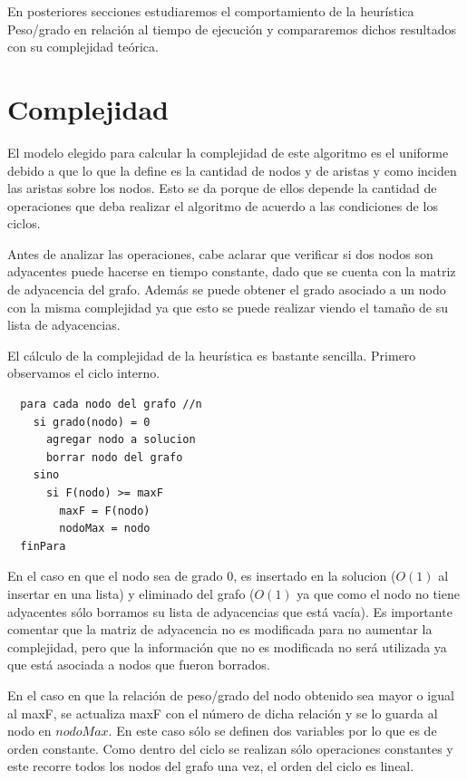 \documentclass[a4paper,11pt] {article}
\begin{document}
En posteriores secciones estudiaremos el comportamiento de la heur\'istica Peso/grado en relaci\'on al tiempo de ejecuci\'on y compararemos dichos resultados con su complejidad te\'orica.

\section*{Complejidad}

El modelo elegido para calcular la complejidad de este algoritmo es el uniforme debido a que lo que la define es la cantidad de nodos y de aristas y como inciden las aristas sobre los nodos. Esto se da porque de ellos depende la cantidad de operaciones que deba realizar el algoritmo de acuerdo a las condiciones de los ciclos.

Antes de analizar las operaciones, cabe aclarar que verificar si dos nodos son adyacentes puede hacerse en tiempo constante, dado que se cuenta con la matriz de adyacencia del grafo. Además se puede obtener el grado asociado a un nodo con la misma complejidad ya que esto se puede realizar viendo el tamaño de su lista de adyacencias.

El cálculo de la complejidad de la heurística es bastante sencilla. Primero observamos el ciclo interno.

\begin{verbatim}
  para cada nodo del grafo //n
    si grado(nodo) = 0  
      agregar nodo a solucion
      borrar nodo del grafo
    sino
      si F(nodo) >= maxF
        maxF = F(nodo)
        nodoMax = nodo
  finPara
\end{verbatim}

En el caso en que el nodo sea de grado $0$, es insertado en la solucion ($O(1)$ al insertar en una lista) y eliminado del grafo ($O(1)$ ya que como el nodo no tiene adyacentes sólo borramos su lista de adyacencias que está vacía).
Es importante comentar que la matriz de adyacencia no es modificada para no aumentar la complejidad, pero que la información que no es modificada no será utilizada ya que está asociada a nodos que fueron borrados.

En el caso en que la relación de peso/grado del nodo obtenido sea mayor o igual al maxF, se actualiza maxF con el número de dicha relación y se lo guarda al nodo en $nodoMax$. En este caso sólo se definen dos variables por lo que es de orden constante. Como dentro del ciclo se realizan sólo operaciones constantes y este recorre todos los nodos del grafo una vez, el orden del ciclo es lineal.
\end{document}

